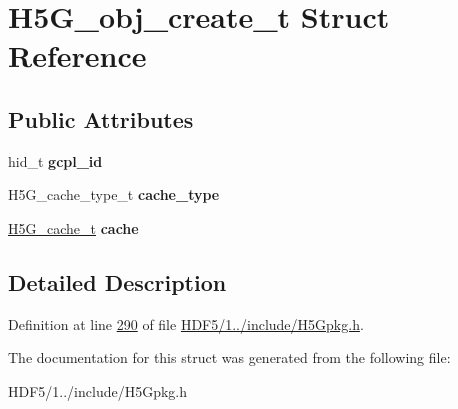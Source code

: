 \hypertarget{struct_h5_g__obj__create__t}{}\section{H5\+G\+\_\+obj\+\_\+create\+\_\+t Struct Reference}
\label{struct_h5_g__obj__create__t}
\subsection*{Public Attributes}
\begin{DoxyCompactItemize}
\item 
\mbox{\label{struct_h5_g__obj__create__t_a9fa4f9f1d9195e43dce06bf6c0f9ba2e}} 
hid\+\_\+t {\bfseries gcpl\+\_\+id}
\item 
\mbox{\label{struct_h5_g__obj__create__t_a3d58a2bb034ef5bd3965bb4e5bba225b}} 
H5\+G\+\_\+cache\+\_\+type\+\_\+t {\bfseries cache\+\_\+type}
\item 
\mbox{\label{struct_h5_g__obj__create__t_aef1fc7c645d747becb2a8fb6346c4c31}} 
\hyperlink{union_h5_g__cache__t}{H5\+G\+\_\+cache\+\_\+t} {\bfseries cache}
\end{DoxyCompactItemize}


\subsection{Detailed Description}


Definition at line \hyperlink{_h_d_f5_21_810_81_2include_2_h5_gpkg_8h_source_l00290}{290} of file \hyperlink{_h_d_f5_21_810_81_2include_2_h5_gpkg_8h_source}{H\+D\+F5/1../include/\+H5\+Gpkg.\+h}.



The documentation for this struct was generated from the following file\+:\begin{DoxyCompactItemize}
\item 
H\+D\+F5/1../include/\+H5\+Gpkg.\+h\end{DoxyCompactItemize}
